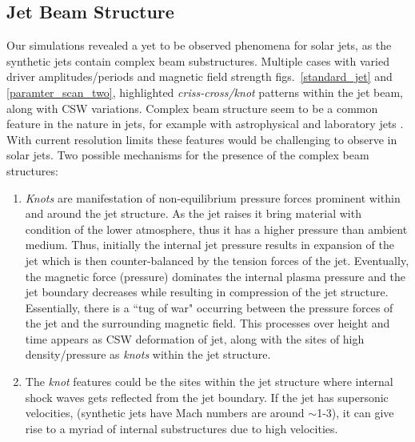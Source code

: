 \documentclass[12pt]{ociamthesis}
\begin{document}
\subsection{Jet Beam Structure}
\label{subsec:j_beam_struc}
Our simulations revealed a yet to be observed phenomena for solar jets, as the synthetic jets contain complex beam substructures. Multiple cases with varied driver amplitudes/periods and magnetic field strength figs.~\ref{standard_jet} and \ref{paramter_scan_two}, highlighted \textit{criss-cross/knot} patterns within the jet beam, along with CSW variations. Complex beam structure seem to be a common feature in the nature in jets, for example with astrophysical \citep{van_Putten_1996ApJ467L57V, DeGouveiaDalPino2005, Hada2013ApJ77570H, Cohen2014ApJ787151C, Hervet2017AnA606A103H} and laboratory jets \citep{Menon2010, Edgington-Mitchell2014, Ono2014}. With current resolution limits these features would be challenging to observe in solar jets. Two possible mechanisms for the presence of the complex beam structures:
\begin{enumerate}
\item{\textit{Knots} are manifestation of non-equilibrium pressure forces prominent within and around the jet structure. As the jet raises it bring material with condition of the lower atmosphere, thus it has a higher pressure than ambient medium. Thus, initially the internal jet pressure results in expansion of the jet which is then counter-balanced by the tension forces of the jet. Eventually, the magnetic force (pressure) dominates the internal plasma pressure and the jet boundary decreases while resulting in compression of the jet structure. Essentially, there is a ``tug of war" occurring between the pressure forces of the jet and the surrounding magnetic field. This processes over height and time appears as CSW deformation of jet, along with the sites of high density/pressure as \textit{knots} within the jet structure.}
\item{The \textit{knot} features could be the sites within the jet structure where internal shock waves \citep{Norman1982} gets reflected from the jet boundary. If the jet has supersonic velocities,  (synthetic jets have Mach numbers are around $\sim$1-3), it can give rise to a myriad of internal substructures due to high velocities.}
\end{enumerate}
\end{document}
